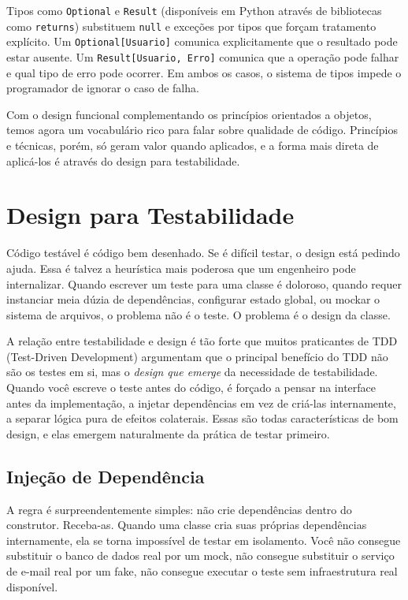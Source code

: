 Tipos como \texttt{Optional} e \texttt{Result} (disponíveis em Python
através de bibliotecas como \texttt{returns}) substituem \texttt{null}
e exceções por tipos que forçam tratamento explícito. Um \texttt{Optional[Usuario]}
comunica explicitamente que o resultado pode estar ausente. Um
\texttt{Result[Usuario, Erro]} comunica que a operação pode falhar e qual
tipo de erro pode ocorrer. Em ambos os casos, o sistema de tipos impede
o programador de ignorar o caso de falha.

Com o design funcional complementando os princípios orientados a objetos,
temos agora um vocabulário rico para falar sobre qualidade de código.
Princípios e técnicas, porém, só geram valor quando aplicados, e a forma
mais direta de aplicá-los é através do design para testabilidade.


\section{Design para Testabilidade}

Código testável é código bem desenhado. Se é difícil testar, o design está
pedindo ajuda. Essa é talvez a heurística mais poderosa que um engenheiro
pode internalizar. Quando escrever um teste para uma classe é doloroso,
quando requer instanciar meia dúzia de dependências, configurar estado global,
ou mockar o sistema de arquivos, o problema não é o teste. O problema é o
design da classe.

A relação entre testabilidade e design é tão forte que muitos praticantes de
TDD (Test-Driven Development) argumentam que o principal benefício do TDD não
são os testes em si, mas o \emph{design que emerge} da necessidade de
testabilidade. Quando você escreve o teste antes do código, é forçado a pensar
na interface antes da implementação, a injetar dependências em vez de criá-las
internamente, a separar lógica pura de efeitos colaterais. Essas são todas
características de bom design, e elas emergem naturalmente da prática de
testar primeiro.

\subsection{Injeção de Dependência}

A regra é surpreendentemente simples: não crie dependências dentro do
construtor. Receba-as. Quando uma classe cria suas próprias dependências
internamente, ela se torna impossível de testar em isolamento. Você não
consegue substituir o banco de dados real por um mock, não consegue
substituir o serviço de e-mail real por um fake, não consegue executar o
teste sem infraestrutura real disponível.

